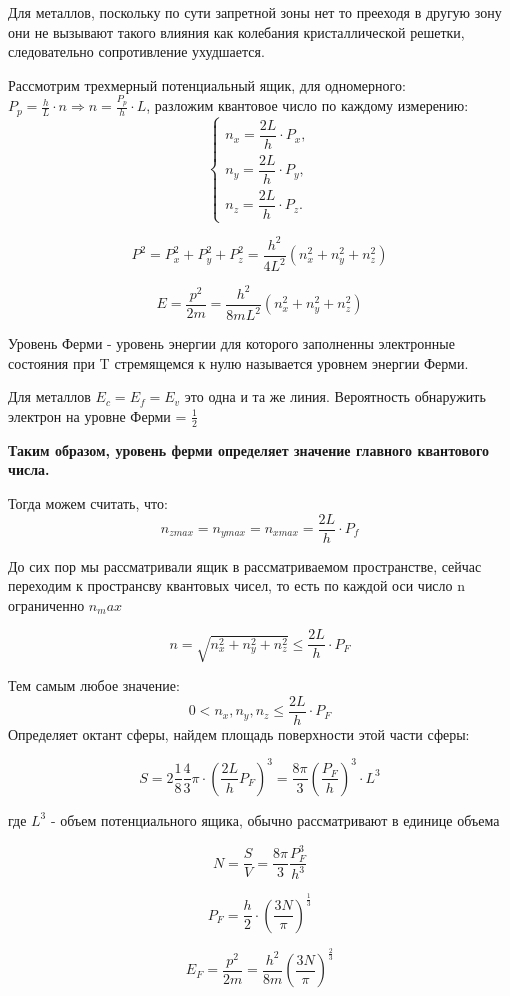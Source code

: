 \documentclass[../main.tex]{subfiles}
\begin{document}
Для металлов, поскольку по сути запретной зоны нет то прееходя в другую зону они не вызывают такого влияния как колебания кристаллической решетки, следовательно 
сопротивление ухудшается.

Рассмотрим трехмерный потенциальный ящик, для одномерного: $P_p = \frac{h}{L} \cdot n \Rightarrow n = \frac{P_p}{h} \cdot L$, разложим квантовое число по каждому измерению: 
\[
\begin{cases}
n_x = \dfrac{2L}{h} \cdot P_x,\\[4pt]
n_y = \dfrac{2L}{h} \cdot P_y,\\[4pt]
n_z = \dfrac{2L}{h} \cdot P_z.
\end{cases}
\]


\[P^2 = P^2_x + P^2_y + P^2_z = \frac{h^2}{4L^2}(n_x^2 + n_y^2+n_z^2)\]

\[E = \frac{p^2}{2m} = \frac{h^2}{8mL^2}(n_x^2 + n_y^2+n_z^2)\]

 Уровень Ферми - уровень энергии для которого заполненны электронные состояния  при T стремящемся к нулю называется уровнем энергии Ферми.

Для металлов $E_c = E_f = E_v$ это одна и та же линия. Вероятность обнаружить электрон на уровне Ферми = $\frac{1}{2}$

\textbf{Таким образом, уровень ферми определяет значение главного квантового числа.}

Тогда можем считать, что:
\[n_{zmax} = n_{ymax} = n_{xmax} = \frac{2L}{h} \cdot P_f\]

До сих пор мы рассматривали ящик в рассматриваемом пространстве, сейчас переходим к пространсву квантовых чисел, то есть 
по каждой оси число n ограниченно $n_max$

\[n = \sqrt{n^2_x+n^2_y+n^2_z} \leq \frac{2L}{h} \cdot P_F\]

Тем самым любое значение: 
\[0 < n_x, n_y,n_z \leq \frac{2L}{h} \cdot P_F\]
Определяет октант сферы, найдем площадь поверхности этой части сферы:

\[S = 2 \frac{1}{8} \frac{4}{3} \pi \cdot (\frac{2L}{h} P_F)^3 = \frac{8 \pi}{3} (\frac{P_F}{h})^3 \cdot L^3\]
\begin{center}
    где $L^3$ - объем потенциального ящика, обычно рассматривают в единице объема    
\end{center}

\[N = \frac{S}{V} = \frac{8 \pi}{3} \frac{P_F^3}{h^3}\]

\[P_F = \frac{h}{2} \cdot (\frac{3N}{\pi})^{\frac{1}{3}}\]

\[E_F = \frac{p^2}{2m} = \frac{h^2}{8m}(\frac{3N}{\pi})^{\frac{2}{3}}\]
\end{document}
